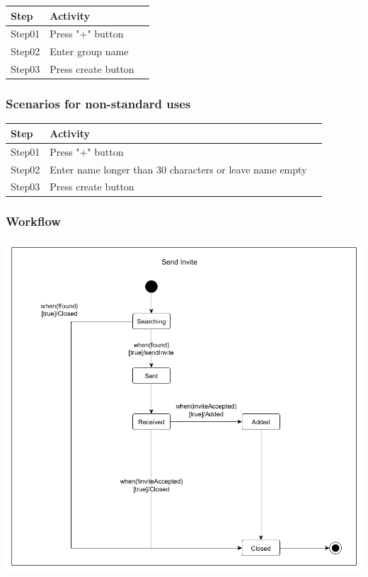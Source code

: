 \documentclass[12pt]{article}
\theoremstyle{definition}
\begin{document}
\begin{tabular}{|l|l|l|}
\hline
Step & Activity \\ \hline
Step01 & Press "+" button\\ \hline
Step02 & Enter group name \\ \hline
Step03 & Press create button\\ \hline
\end{tabular}

\subsubsection{Scenarios for non-standard uses}

\begin{tabular}{|l|l|l|}
\hline
Step & Activity \\ \hline
Step01 & Press "+" button \\ \hline
Step02 & Enter name longer than 30 characters or leave name empty \\ \hline
Step03 & Press create button \\ \hline
\end{tabular}

\subsubsection{Workflow}

\includegraphics[scale=.5]{StateSendInvite.png}
\end{document}
